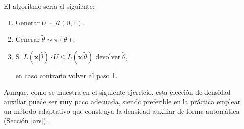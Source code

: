\documentclass[
]{book}
\theoremstyle{break}
\theoremstyle{nonumberplain}
\begin{document}
El algoritmo sería el siguiente:

\begin{enumerate}
\def\labelenumi{\arabic{enumi}.}
\item
  Generar \(U \sim \mathcal{U}(0, 1)\).
\item
  Generar \(\tilde{\theta}\sim \pi(\theta)\).
\item
  Si \(L(\mathbf{x}|\hat{\theta})\cdot U \leq L(\mathbf{x}|\tilde{\theta})\) devolver \(\tilde{\theta}\),

  en caso contrario volver al paso 1.
\end{enumerate}

Aunque, como se muestra en el siguiente ejercicio, esta elección de densidad auxiliar puede ser muy poco adecuada, siendo preferible en la práctica emplear un método adaptativo que construya la densidad auxiliar de forma automática (Sección \ref{ars}).
\end{document}
